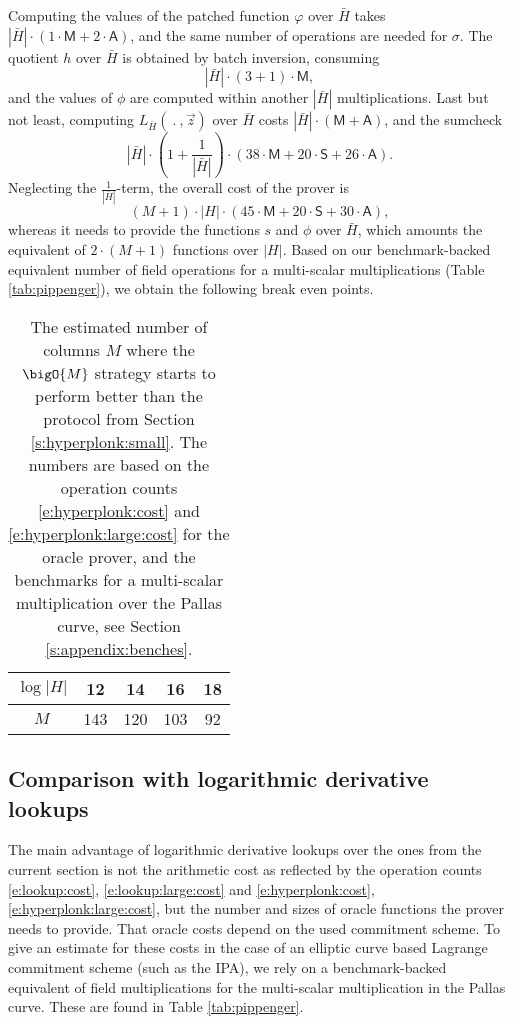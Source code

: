 \documentclass[11pt]{article}
\theoremstyle{definition}
\theoremstyle{remark}
\begin{document}
Computing the values of the patched function $\varphi$  over $\bar H$ takes $|\bar H |\cdot (1\cdot \mathsf M + 2\cdot \mathsf A)$,
and the same number of operations are needed for $\sigma$.
The quotient $h$ over $\bar H$ is obtained by batch inversion, consuming
\[
|\bar H|\cdot (3 + 1) \cdot \mathsf M,
\]
and the values of $\phi$ are computed within another $|\bar H|$ multiplications.
Last but not least, computing $L_{\bar H}(\:.\:, \vec z)$ over $\bar H$ costs $|\bar H|\cdot (\mathsf M + \mathsf A)$, and the sumcheck 
\[
|\bar H| \cdot \left(1 + \frac{1}{|\bar H|}\right) \cdot (38 \cdot \mathsf M + 20 \cdot \mathsf S + 26\cdot\mathsf A).
\] 
Neglecting the $\frac{1}{|\bar H|}$-term, the overall cost of the prover is
\begin{equation}
\label{e:hyperplonk:large:cost}
(M+1)\cdot |H| \cdot (45 \cdot \mathsf M + 20 \cdot \mathsf S + 30\cdot\mathsf A),
\end{equation}
whereas it needs to provide the functions $s$ and $\phi$ over $\bar H$, which amounts the equivalent of $2\cdot (M+1)$ functions over $|H|$.
Based on our benchmark-backed equivalent number of field operations for a multi-scalar multiplications (Table \ref{tab:pippenger}), we obtain the following break even points.
\begin{table}[h!]
\caption{%
The estimated number of columns $M$ where the $\bigO{M}$ strategy starts to perform better than the protocol from Section \ref{s:hyperplonk:small}. 
The numbers are based on the operation counts \eqref{e:hyperplonk:cost} and \eqref{e:hyperplonk:large:cost} for the oracle prover, and the benchmarks for a multi-scalar multiplication over the Pallas curve, see Section \ref{s:appendix:benches}.
}
\vspace*{0.5cm}
\centering
\begin{tabular} {|c|c|c|c|c|}
\hline
$\log|H|$ & 12 & 14 & 16 & 18
\\\hline
$M$ & 143 & 120 & 103 & 92
\\\hline
\end{tabular}
\end{table}

\subsection{Comparison with logarithmic derivative lookups}

The main advantage of logarithmic derivative lookups over the ones from the current section is not the arithmetic cost  as reflected by the operation counts  \eqref{e:lookup:cost}, \eqref{e:lookup:large:cost} and \eqref{e:hyperplonk:cost}, \eqref{e:hyperplonk:large:cost}, but the number and sizes of oracle functions the prover needs to provide.
That oracle costs depend on the used commitment scheme.
To give an estimate for these costs in the case of an elliptic curve based Lagrange commitment scheme (such as the IPA), we 
rely on a benchmark-backed equivalent of field multiplications for the multi-scalar multiplication in the Pallas curve.
These are found in Table \ref{tab:pippenger}.
\end{document}
